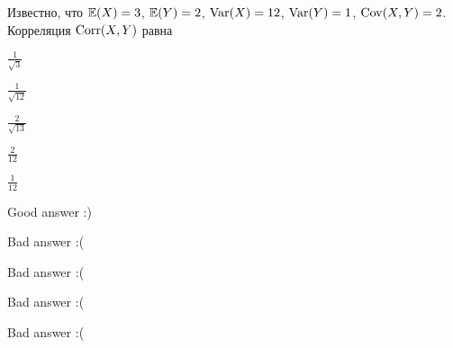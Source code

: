 
\begin{question}
Известно, что \(\operatorname{\mathbb{E}}(X)=3\), \(\operatorname{\mathbb{E}}(Y)=2\), \(\operatorname{Var}(X)=12\), \(\operatorname{Var}(Y)=1\),
\(\operatorname{Cov}(X,Y)=2\). Корреляция \(\operatorname{Corr}(X,Y)\) равна
\begin{answerlist}
  \item \(\frac{1}{\sqrt{3}}\)
  \item \(\frac{1}{\sqrt{12}}\)
  \item \(\frac{2}{\sqrt{13}}\)
  \item \(\frac{2}{12}\)
  \item \(\frac{1}{12}\)
\end{answerlist}
\end{question}

\begin{solution}
\begin{answerlist}
  \item Good answer :)
  \item Bad answer :(
  \item Bad answer :(
  \item Bad answer :(
  \item Bad answer :(
\end{answerlist}
\end{solution}

